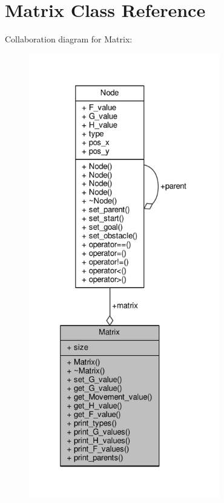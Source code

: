 \hypertarget{class_matrix}{\section{Matrix Class Reference}
\label{class_matrix}
}


Collaboration diagram for Matrix\+:
\nopagebreak
\begin{figure}[H]
\begin{center}
\leavevmode
\includegraphics[height=550pt]{class_matrix__coll__graph}
\end{center}
\end{figure}

